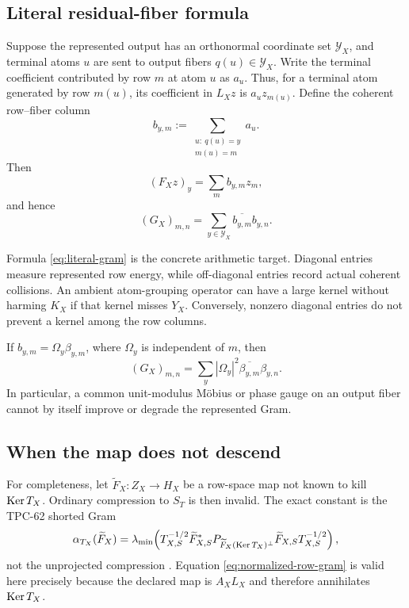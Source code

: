 \subsection{Literal residual-fiber formula}
Suppose the represented output has an orthonormal coordinate set
\(\mathcal Y_X\), and terminal atoms \(u\) are sent to output fibers
\(q(u)\in\mathcal Y_X\). Write the terminal coefficient contributed by row
\(m\) at atom \(u\) as \(a_u\). Thus, for a terminal atom generated by row
\(m(u)\), its coefficient in \(L_Xz\) is \(a_uz_{m(u)}\). Define the coherent
row--fiber column
\begin{equation}\label{eq:bym}
 b_{y,m}:=
 \sum_{\substack{u:\ q(u)=y\\m(u)=m}}a_u.
\end{equation}
Then
\begin{equation}\label{eq:fiber-output}
 (F_Xz)_y=\sum_m b_{y,m}z_m,
\end{equation}
and hence
\begin{equation}\label{eq:literal-gram}
 \boxed{\quad
 (G_X)_{m,n}
 =\sum_{y\in\mathcal Y_X}\overline{b_{y,m}}b_{y,n}.
 \quad}
\end{equation}

Formula \eqref{eq:literal-gram} is the concrete arithmetic target. Diagonal
entries measure represented row energy, while off-diagonal entries record
actual coherent collisions. An ambient atom-grouping operator can have a
large kernel without harming \(K_X\) if that kernel misses \(Y_X\). Conversely,
nonzero diagonal entries do not prevent a kernel among the row columns.

\begin{corollary}\label{cor:gauge}
If \(b_{y,m}=\Omega_y\beta_{y,m}\), where \(\Omega_y\) is independent of \(m\),
then
\[
 (G_X)_{m,n}
 =\sum_y|\Omega_y|^2\overline{\beta_{y,m}}\beta_{y,n}.
\]
In particular, a common unit-modulus M\"obius or phase gauge on an output
fiber cannot by itself improve or degrade the represented Gram.
\end{corollary}

\subsection{When the map does not descend}
For completeness, let \(\widetilde F_X:Z_X\to H_X\) be a row-space map not
known to kill \(\operatorname{Ker} T_X\). Ordinary compression to \(S_T\) is then invalid.
The exact constant is the TPC-62 shorted Gram
\begin{equation}\label{eq:shorted-nondescending}
 \alpha_{T_X}(\widetilde F_X)
 =\lambda_{\min}\!\left(
 T_{X,S}^{-1/2}\widetilde F_{X,S}^*
 P_{\widetilde F_X(\operatorname{Ker} T_X)^\perp}
 \widetilde F_{X,S}T_{X,S}^{-1/2}
 \right),
\end{equation}
not the unprojected compression \citep{WangTPC62}. Equation
\eqref{eq:normalized-row-gram} is valid here precisely because the declared
map is \(A_XL_X\) and therefore annihilates \(\operatorname{Ker} T_X\).
